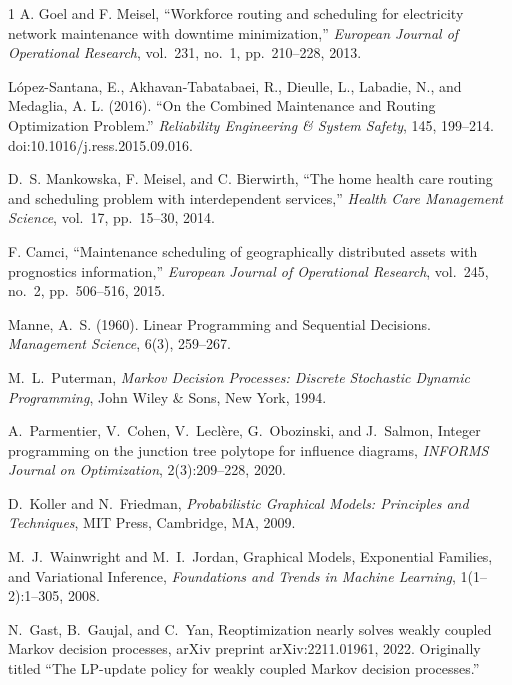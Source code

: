 \documentclass{article}
\begin{document}
\begin{thebibliography}{1}
A. Goel and F. Meisel, ``Workforce routing and scheduling for
electricity network maintenance with downtime minimization,''
\emph{European Journal of Operational Research}, vol.~231, no.~1,
pp.~210--228, 2013.

López-Santana, E., Akhavan-Tabatabaei, R., Dieulle, L., Labadie, N., and Medaglia, A. L. (2016).
``On the Combined Maintenance and Routing Optimization Problem.''
\textit{Reliability Engineering \& System Safety}, 145, 199--214.
doi:10.1016/j.ress.2015.09.016.

D.~S. Mankowska, F. Meisel, and C. Bierwirth, ``The home health care
routing and scheduling problem with interdependent services,''
\emph{Health Care Management Science}, vol.~17, pp.~15--30, 2014.

F. Camci, ``Maintenance scheduling of geographically distributed
assets with prognostics information,'' \emph{European Journal of
Operational Research}, vol.~245, no.~2, pp.~506--516, 2015.

Manne, A.~S. (1960).
\newblock Linear Programming and Sequential Decisions.
\newblock \emph{Management Science}, 6(3), 259--267.

M.~L.~Puterman,
\newblock \emph{Markov Decision Processes: Discrete Stochastic Dynamic Programming},
\newblock John Wiley \& Sons, New York, 1994.

A.~Parmentier, V.~Cohen, V.~Leclère, G.~Obozinski, and J.~Salmon,
\newblock Integer programming on the junction tree polytope for influence diagrams,
\newblock \emph{INFORMS Journal on Optimization}, 2(3):209--228, 2020.

D.~Koller and N.~Friedman,
\newblock \emph{Probabilistic Graphical Models: Principles and Techniques},
\newblock MIT Press, Cambridge, MA, 2009.

M.~J.~Wainwright and M.~I.~Jordan,
\newblock Graphical Models, Exponential Families, and Variational Inference,
\newblock \emph{Foundations and Trends in Machine Learning}, 1(1--2):1--305, 2008.

N.~Gast, B.~Gaujal, and C.~Yan,
\newblock Reoptimization nearly solves weakly coupled {M}arkov decision processes,
\newblock arXiv preprint arXiv:2211.01961, 2022.
\newblock Originally titled ``The LP-update policy for weakly coupled Markov decision
  processes.''


\end{thebibliography}
\end{document}

